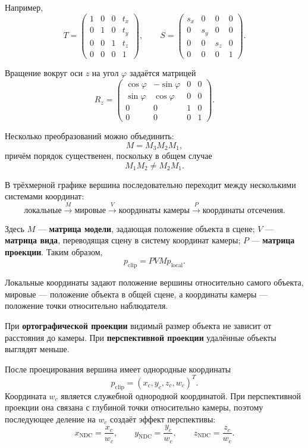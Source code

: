 Например,
\[
T=
\begin{pmatrix}
	1&0&0&t_x\\
	0&1&0&t_y\\
	0&0&1&t_z\\
	0&0&0&1
\end{pmatrix},
\qquad
S=
\begin{pmatrix}
	s_x&0&0&0\\
	0&s_y&0&0\\
	0&0&s_z&0\\
	0&0&0&1
\end{pmatrix}.
\]

Вращение вокруг оси $z$ на угол $\varphi$ задаётся матрицей
\[
R_z=
\begin{pmatrix}
	\cos\varphi&-\sin\varphi&0&0\\
	\sin\varphi& \cos\varphi&0&0\\
	0&0&1&0\\
	0&0&0&1
\end{pmatrix}.
\]

Несколько преобразований можно объединить:
\[
M=M_3M_2M_1,
\]
причём порядок существенен, поскольку в общем случае
\[
M_1M_2\ne M_2M_1.
\]

В трёхмерной графике вершина последовательно переходит между несколькими системами координат:
\[
\text{локальные}
\xrightarrow{M}
\text{мировые}
\xrightarrow{V}
\text{координаты камеры}
\xrightarrow{P}
\text{координаты отсечения}.
\]

Здесь $M$ --- \textbf{матрица модели}, задающая положение объекта в сцене; $V$ --- \textbf{матрица вида}, переводящая сцену в систему координат камеры; $P$ --- \textbf{матрица проекции}. Таким образом,
\[
p_{\mathrm{clip}}=PVMp_{\mathrm{local}}.
\]

Локальные координаты задают положение вершины относительно самого объекта, мировые --- положение объекта в общей сцене, а координаты камеры --- положение точки относительно наблюдателя.

При \textbf{ортографической проекции} видимый размер объекта не зависит от расстояния до камеры. При \textbf{перспективной проекции} удалённые объекты выглядят меньше.

После проецирования вершина имеет однородные координаты
\[
p_{\mathrm{clip}}=(x_c,y_c,z_c,w_c)^T.
\]
Координата $w_c$ является служебной однородной координатой. При перспективной проекции она связана с глубиной точки относительно камеры, поэтому последующее деление на $w_c$ создаёт эффект перспективы:
\[
x_{\mathrm{NDC}}=\frac{x_c}{w_c},
\qquad
y_{\mathrm{NDC}}=\frac{y_c}{w_c},
\qquad
z_{\mathrm{NDC}}=\frac{z_c}{w_c}.
\]

